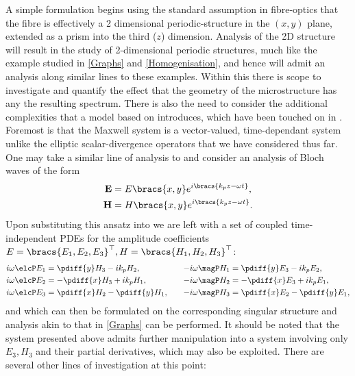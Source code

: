 A simple formulation begins using the standard assumption in fibre-optics that the fibre is effectively a 2 dimensional periodic-structure in the $(x,y)$ plane, extended as a prism into the third ($z$) dimension.
Analysis of the 2D structure will result in the study of 2-dimensional periodic structures, much like the example studied in \cref{Graphs} and \cref{Homogenisation}, and hence will admit an analysis along similar lines to these examples.
Within this there is scope to investigate and quantify the effect that the geometry of the microstructure has any the resulting spectrum.
There is also the need to consider the additional complexities that a model based on  introduces, which have been touched on in .
Foremost is that the Maxwell system is a vector-valued, time-dependant system unlike the elliptic scalar-divergence operators that we have considered thus far.
One may take a similar line of analysis to \cite{cooper2014bandgaps} and consider an analysis of Bloch waves of the form 
\begin{align*}
	\mathbf{E} &= E\bracs{x,y}e^{i\bracs{k_{p}z - \omega t}}, \\
	\mathbf{H} &= H\bracs{x,y}e^{i\bracs{k_{p}z - \omega t}}.
\end{align*}
Upon substituting this ansatz into  we are left with a set of coupled time-independent PDEs for the amplitude coefficients $E = \bracs{E_{1},E_{2},E_{3}}^{\top}, H = \bracs{H_{1},H_{2},H_{3}}^{\top}$:
\begin{align*}
	i\omega\elcP E_{1} &= \pdiff{y}H_{3} - ik_{p}H_{2}, &\quad
	-i\omega\magP H_{1} &= \pdiff{y}E_{3} - ik_{p}E_{2}, \\
	i\omega\elcP E_{2} &= -\pdiff{x}H_{3} + ik_{p}H_{1}, &\quad
	-i\omega\magP H_{2} &= -\pdiff{x}E_{3} + ik_{p}E_{1}, \\
	i\omega\elcP E_{3} &= \pdiff{x}H_{2} - \pdiff{y}H_{1}, &\quad
	-i\omega\magP H_{3} &= \pdiff{x}E_{2} - \pdiff{y}E_{1},
\end{align*}
and which can then be formulated on the corresponding singular structure and analysis akin to that in \cref{Graphs} can be performed.
It should be noted that the system presented above admits further manipulation into a system involving only $E_{3}, H_{3}$ and their partial derivatives, which may also be exploited.
There are several other lines of investigation at this point:
